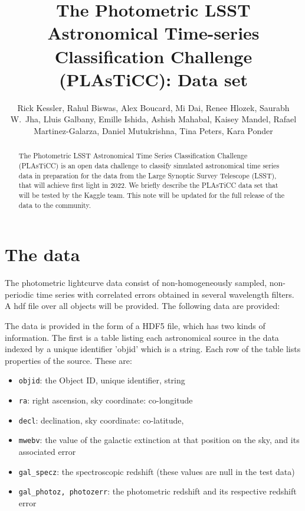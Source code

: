 \documentclass[\docopts]{\docclass}
\author{Rick Kessler,  Rahul Biswas, Alex Boucard, Mi Dai, Renee Hlozek,
Saurabh W.~Jha, Lluis Galbany, Emille Ishida, Ashish Mahabal, Kaisey Mandel, Rafael Martinez-Galarza, Daniel Mutukrishna, Tina Peters, Kara Ponder}
\begin{document}
\title{The Photometric LSST Astronomical Time-series Classification Challenge (PLAsTiCC): Data set}


\begin{abstract}
The Photometric LSST Astronomical Time Series Classification Challenge (PLAsTiCC) is an open data challenge to classify simulated astronomical time series data in preparation for the data from the Large Synoptic Survey Telescope (LSST), that will achieve first light in 2022. We briefly describe the PLAsTiCC data set that will be tested by the Kaggle team. This note will be updated for the full release of the data to the community.

\end{abstract}

\dockeys{}

\maketitlepost


\section{The data}
\label{sec:thedata}

The photometric lightcurve data consist of non-homogeneously sampled, non-periodic time series with correlated errors obtained in several wavelength filters.
A hdf file over all objects will be provided. The following data are provided:

The {\plasticc} data is provided in the form of a HDF5 file, which has two kinds of information. The first
is a table listing each astronomical source in the data indexed by a unique identifier 'objid' which is a string. Each row of the table lists properties of the source. These are: 
\begin{itemize}
\item {\tt objid}: the Object ID, unique identifier, string
\item {\tt ra}: right ascension, sky coordinate: co-longitude
\item {\tt decl}: declination, sky coordinate: co-latitude,  
\item {\tt mwebv}: the value of the galactic extinction at that position on the sky, and its associated error
\item {\tt gal_specz}: the spectroscopic redshift (these values are null in the test data)
\item {\tt gal_photoz, photozerr}: the photometric redshift and its respective redshift error 
\end{itemize}
\end{document}
